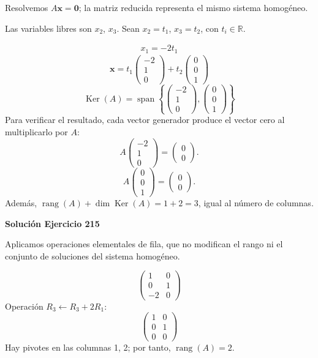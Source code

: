 \documentclass[12pt]{article}
\newcommand{\rang}{\operatorname{rang}}
\newcommand{\Ker}{\operatorname{Ker}}
\newcommand{\vect}[1]{\boldsymbol{#1}}
\begin{document}
Resolvemos $A\vect x=\vect0$; la matriz reducida representa el mismo sistema homogéneo.

Las variables libres son $x_{2}$, $x_{3}$. Sean $x_{2}=t_{1}$, $x_{3}=t_{2}$, con $t_i\in\mathbb R$.

\[
\begin{aligned}x_{1}=- 2 t_{1}\end{aligned}
\]
\[
\vect x=t_{1}\begin{pmatrix}-2\\1\\0\end{pmatrix} + t_{2}\begin{pmatrix}0\\0\\1\end{pmatrix}
\]
\[
\boxed{\Ker(A)=\operatorname{span}\left\{\begin{pmatrix}-2\\1\\0\end{pmatrix},\begin{pmatrix}0\\0\\1\end{pmatrix}\right\}}
\]
Para verificar el resultado, cada vector generador produce el vector cero al multiplicarlo por $A$:
\[
A\begin{pmatrix}-2\\1\\0\end{pmatrix}=\begin{pmatrix}0\\0\end{pmatrix}.
\]
\[
A\begin{pmatrix}0\\0\\1\end{pmatrix}=\begin{pmatrix}0\\0\end{pmatrix}.
\]
Además, $\rang(A)+\dim\Ker(A)=1+2=3$, igual al número de columnas.


\par\bigskip\noindent\textbf{Solución Ejercicio 215}\par\nobreak
Aplicamos operaciones elementales de fila, que no modifican el rango ni el conjunto de soluciones del sistema homogéneo.

\[
\begin{pmatrix}1&0\\0&1\\-2&0\end{pmatrix}
\]
Operación $R_{3}\leftarrow R_{3}+2R_{1}$:
\[
\begin{pmatrix}1&0\\0&1\\0&0\end{pmatrix}
\]
Hay pivotes en las columnas 1, 2; por tanto, $\boxed{\rang(A)=2}$.
\end{document}
